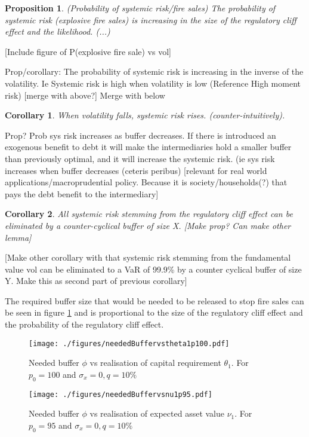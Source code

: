 \documentclass[11pt]{article}
\newtheorem{proposition}{Proposition}
\newtheorem{corollary}{Corollary}
\begin{document}
\begin{appendices}
\begin{proposition} (Probability of systemic risk/fire sales)
The probability of systemic risk (explosive fire sales) is increasing in the size of the regulatory cliff effect and the likelihood. (...)
\end{proposition}

[Include figure of P(explosive fire sale) vs vol]

Prop/corollary: The probability of systemic risk is increasing in the inverse of the volatility. Ie Systemic risk is high when volatility is low (Reference High moment risk) [merge with above?]
Merge with below
\begin{corollary}
When volatility falls, systemic risk rises. (counter-intuitively).
\end{corollary}

Prop? Prob sys risk increases as buffer decreases. If there is introduced an exogenous benefit to debt it will make the intermediaries hold a smaller buffer than previously optimal, and it will increase the systemic risk. (ie sys risk increases when buffer decreases (ceteris peribus) [relevant for real world applications/macroprudential policy. Because it is society/households(?) that pays the debt benefit to the intermediary]

\begin{corollary}
All systemic risk stemming from the regulatory cliff effect can be eliminated by a counter-cyclical buffer of size X. [Make prop? Can make other lemma] 
\end{corollary}

[Make other corollary with that systemic risk stemming from the fundamental value vol can be eliminated to a VaR of 99.9\% by a counter cyclical buffer of size Y. Make this as second part of previous corollary]

The required buffer size that would be needed to be released to stop fire sales can be seen in figure \ref{f_neededBuffervsRegSize} and is proportional to the size  of the regulatory cliff effect and the probability of the regulatory cliff effect.
\begin{figure}[h]
\centering
\texttt{[image: ./figures/neededBuffervstheta1p100.pdf]}
\caption{Needed buffer $\phi$ vs realisation of capital requirement  $\theta_1$. For $p_0 = 100$ and $\sigma_x = 0, q = 10\%$}
\label{f_neededBuffervsRegSize}
\end{figure}

\begin{figure}[h]
\centering
\texttt{[image: ./figures/neededBuffervsnu1p95.pdf]}
\caption{Needed buffer $\phi$ vs realisation of expected asset value  $\nu_1$. For $p_0 = 95$ and $\sigma_x = 0, q = 10\%$}
\label{f_neededbufvfunShock}
\end{figure}


\end{appendices}
\end{document}
